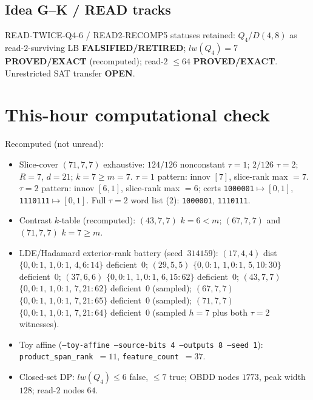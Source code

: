 \documentclass[11pt]{article}
\begin{document}
\subsection*{Idea G--K / READ tracks}
READ-TWICE-Q4-6 / READ2-RECOMP5 statuses retained: $Q_4$/$D(4,8)$ as read-$2$-surviving LB
\textbf{FALSIFIED/RETIRED}; $lw(Q_4)=7$ \textbf{PROVED/EXACT} (recomputed); read-$2$ $\le64$
\textbf{PROVED/EXACT}. Unrestricted SAT transfer \textbf{OPEN}.

\section*{This-hour computational check}
Recomputed (not unread):
\begin{itemize}
\item Slice-cover $(71,7,7)$ exhaustive: $124/126$ nonconstant $\tau{=}1$;
  $2/126$ $\tau{=}2$; $R{=}7$, $d{=}21$; $k{=}7{\ge}m{=}7$.
  $\tau{=}1$ pattern: innov $[7]$, slice-rank max $=7$.
  $\tau{=}2$ pattern: innov $[6,1]$, slice-rank max $=6$; certs
  \texttt{1000001}$\mapsto[0,1]$, \texttt{1110111}$\mapsto[0,1]$.
  Full $\tau{=}2$ word list (2): \texttt{1000001}, \texttt{1110111}.
\item Contrast $k$-table (recomputed): $(43,7,7)$ $k{=}6{<}m$; $(67,7,7)$ and $(71,7,7)$ $k{=}7{\ge}m$.
\item LDE/Hadamard exterior-rank battery (seed~$314159$):
  $(17,4,4)$ dist $\{0,0{:}1,\,1,0{:}1,\,4,6{:}14\}$ deficient~$0$;
  $(29,5,5)$ $\{0,0{:}1,\,1,0{:}1,\,5,10{:}30\}$ deficient~$0$;
  $(37,6,6)$ $\{0,0{:}1,\,1,0{:}1,\,6,15{:}62\}$ deficient~$0$;
  $(43,7,7)$ $\{0,0{:}1,\,1,0{:}1,\,7,21{:}62\}$ deficient~$0$ (sampled);
  $(67,7,7)$ $\{0,0{:}1,\,1,0{:}1,\,7,21{:}65\}$ deficient~$0$ (sampled);
  $(71,7,7)$ $\{0,0{:}1,\,1,0{:}1,\,7,21{:}64\}$ deficient~$0$
  (sampled $h{=}7$ plus both $\tau{=}2$ witnesses).
\item Toy affine (\texttt{--toy-affine --source-bits 4 --outputs 8 --seed 1}):
  \texttt{product\_span\_rank}~$=11$, \texttt{feature\_count}~$=37$.
\item Closed-set DP: $lw(Q_4)\le6$ false, $\le7$ true; OBDD nodes $1773$, peak width $128$;
  read-$2$ nodes $64$.
\end{itemize}
\end{document}
